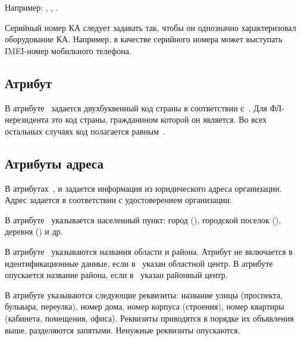 Например: , 
, 
.

Серийный номер КА следует задавать так, чтобы он однозначно характеризовал
оборудование КА. Например, в качестве серийного номера может выступать
IMEI-номер мобильного телефона.

\subsection{Атрибут~}\label{ENTITIES.Id.C}

В атрибуте~ задается двухбуквенный код страны в соответствии
с~\cite{CountryCodes}.
%
Для ФЛ-нерезидента это код страны, гражданином которой он является. Во всех
остальных случаях код полагается равным~.

\subsection{Атрибуты адреса}\label{ENTITIES.Id.L}

В атрибутах~,  и
 задается информация из юридического адреса организации.
%
Адрес задается в соответствии с удостоверением организации. 

В атрибуте~ указывается населенный пункт: город (),
городской поселок (), деревня () и др.
%
%

В атрибуте~ указываются названия области и района.
Атрибут не включается в идентификационные данные, если в~
указан областной центр.
%
В атрибуте опускается название района, если в~ указан
районный центр.
%

В атрибуте  указываются следующие реквизиты: название улицы
(проспекта, бульвара, переулка), номер дома, номер корпуса (строения), номер
квартиры (кабинета, помещения, офиса). Реквизиты приводятся в порядке их
объявления выше, разделяются запятыми. Ненужные реквизиты опускаются.
%

